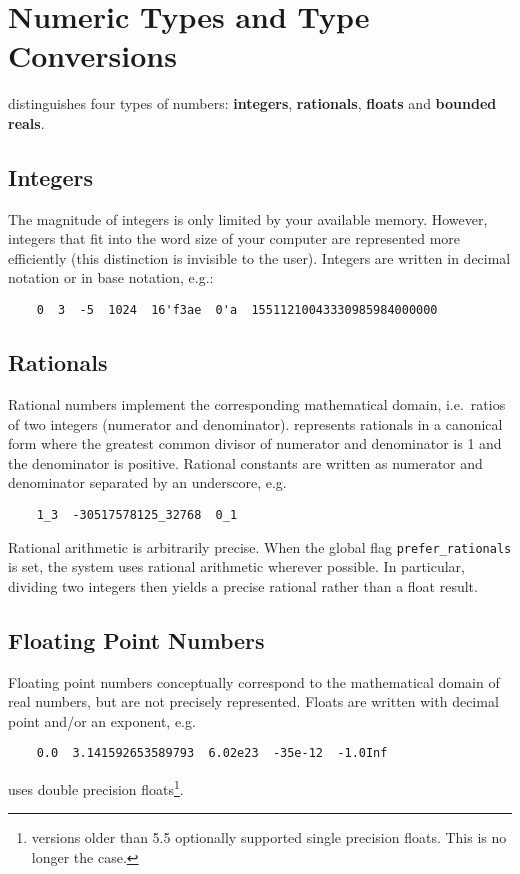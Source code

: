\section{Numeric Types and Type Conversions}
{\eclipse} distinguishes four types of numbers: {\bf integers},
{\bf rationals}, {\bf floats} and {\bf bounded reals}.

\subsection{Integers}
\label{intrep}
The magnitude of integers is only limited by your available memory.
However, integers that fit into the word size of your computer are
represented more efficiently (this distinction is invisible to the user).
Integers are written in decimal notation or in base notation, e.g.:
\begin{verbatim}
	0  3  -5  1024  16'f3ae  0'a  15511210043330985984000000
\end{verbatim}

\subsection{Rationals}
Rational numbers implement the corresponding mathematical domain,
i.e.\ ratios of two integers (numerator and denominator).
{\eclipse} represents rationals in a canonical form where the 
greatest common divisor of numerator and denominator is 1 and the
denominator is positive. Rational constants are written as numerator
and denominator separated by an underscore, e.g.
\begin{verbatim}
	1_3  -30517578125_32768  0_1
\end{verbatim}
Rational arithmetic is arbitrarily precise. When the global flag
{\tt prefer_rationals} is set, the system uses rational arithmetic
wherever possible. In particular, dividing two integers then yields a precise
rational rather than a float result.

\subsection{Floating Point Numbers}
Floating point numbers conceptually correspond to the mathematical
domain of real numbers, but are not precisely represented.
Floats are written with decimal point and/or an exponent, e.g.
\begin{verbatim}
	0.0  3.141592653589793  6.02e23  -35e-12  -1.0Inf
\end{verbatim}
{\eclipse} uses double precision floats\footnote{
{\eclipse} versions older than 5.5 optionally supported single precision
floats. This is no longer the case.}.


